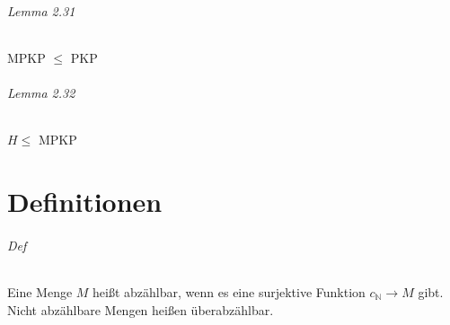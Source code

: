 \paragraph*{Lemma 2.31} MPKP $\leq$ PKP
\paragraph*{Lemma 2.32} $H \leq$ MPKP



\newpage
\part*{Definitionen}
\paragraph*{Def} Eine Menge $M$ heißt abzählbar, wenn es eine surjektive Funktion $c_\mathbb{N}\rightarrow M$ gibt. Nicht abzählbare Mengen heißen überabzählbar.



